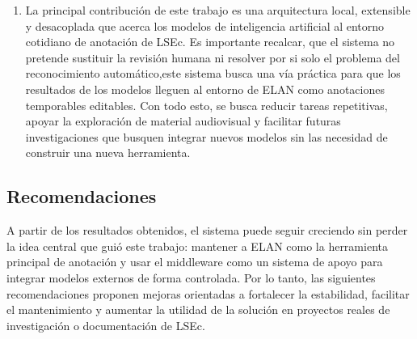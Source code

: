 \documentclass[11pt,a4paper]{article}
\begin{document}
\begin{enumerate}
    \item La principal contribución de este trabajo es una arquitectura local, extensible y desacoplada que acerca los modelos de inteligencia artificial al entorno cotidiano de anotación de LSEc. Es importante recalcar, que el sistema no pretende sustituir la revisión humana ni resolver por si solo el problema del reconocimiento automático,este sistema busca una vía práctica para que los resultados de los modelos lleguen al entorno de ELAN como anotaciones temporables editables. Con todo esto, se busca reducir tareas repetitivas, apoyar la exploración de material audiovisual y facilitar futuras investigaciones que busquen integrar nuevos modelos sin las necesidad de construir una nueva herramienta.
  
\end{enumerate}

\vspace{1\baselineskip}

\subsection{Recomendaciones}

A partir de los resultados obtenidos, el sistema puede seguir creciendo sin perder la idea central que guió este trabajo: mantener a ELAN como la herramienta principal de anotación y usar el middleware como un sistema de apoyo para integrar modelos externos de forma controlada. Por lo tanto, las siguientes recomendaciones proponen mejoras orientadas a fortalecer la estabilidad, facilitar el mantenimiento y aumentar la utilidad de la solución en proyectos reales de investigación o documentación de LSEc.
\end{document}

